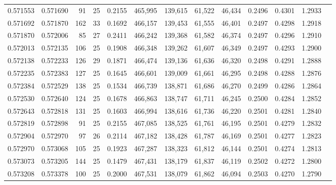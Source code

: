 \begin{tabular}{rrrrrrrrrrrrr}
0.571553 & 0.571690 &  91 &  25 &                                     0.2155 & 465,995 & 139,615 &  61,522 &  46,434 & 0.2496 & 0.4301 & 1.2933 \\
0.571692 & 0.571870 & 162 &  33 &                                     0.1692 & 466,157 & 139,453 &  61,555 &  46,401 & 0.2497 & 0.4298 & 1.2918 \\
0.571870 & 0.572006 &  85 &  27 &                                     0.2411 & 466,242 & 139,368 &  61,582 &  46,374 & 0.2497 & 0.4296 & 1.2910 \\
0.572013 & 0.572135 & 106 &  25 &                                     0.1908 & 466,348 & 139,262 &  61,607 &  46,349 & 0.2497 & 0.4293 & 1.2900 \\
0.572138 & 0.572233 & 126 &  29 &                                     0.1871 & 466,474 & 139,136 &  61,636 &  46,320 & 0.2498 & 0.4291 & 1.2888 \\
0.572235 & 0.572383 & 127 &  25 &                                     0.1645 & 466,601 & 139,009 &  61,661 &  46,295 & 0.2498 & 0.4288 & 1.2876 \\
0.572384 & 0.572529 & 138 &  25 &                                     0.1534 & 466,739 & 138,871 &  61,686 &  46,270 & 0.2499 & 0.4286 & 1.2864 \\
0.572530 & 0.572640 & 124 &  25 &                                     0.1678 & 466,863 & 138,747 &  61,711 &  46,245 & 0.2500 & 0.4284 & 1.2852 \\
0.572643 & 0.572818 & 131 &  25 &                                     0.1603 & 466,994 & 138,616 &  61,736 &  46,220 & 0.2501 & 0.4281 & 1.2840 \\
0.572819 & 0.572898 &  91 &  25 &                                     0.2155 & 467,085 & 138,525 &  61,761 &  46,195 & 0.2501 & 0.4279 & 1.2832 \\
0.572904 & 0.572970 &  97 &  26 &                                     0.2114 & 467,182 & 138,428 &  61,787 &  46,169 & 0.2501 & 0.4277 & 1.2823 \\
0.572970 & 0.573068 & 105 &  25 &                                     0.1923 & 467,287 & 138,323 &  61,812 &  46,144 & 0.2501 & 0.4274 & 1.2813 \\
0.573073 & 0.573205 & 144 &  25 &                                     0.1479 & 467,431 & 138,179 &  61,837 &  46,119 & 0.2502 & 0.4272 & 1.2800 \\
0.573208 & 0.573378 & 100 &  25 &                                     0.2000 & 467,531 & 138,079 &  61,862 &  46,094 & 0.2503 & 0.4270 & 1.2790 \\

\end{tabular}
